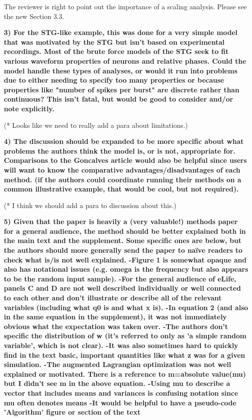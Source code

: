 \documentclass[11pt,a4paper]{article}
\begin{document}
The reviewer is right to point out the importance of a scaling analysis.  Please see the new Section 3.3. 

\textbf{3) For the STG-like example, this was done for a very simple model that was motivated by the STG but isn't based on experimental recordings. Most of the brute force models of the STG seek to fit various waveform properties of neurons and relative phases. Could the model handle these types of analyses, or would it run into problems due to either needing to specify too many properties or because properties like "number of spikes per burst" are discrete rather than continuous? This isn't fatal, but would be good to consider and/or note explicitly. }

(* Looks like we need to really add a para about limitations.)

\textbf{4) The discussion should be expanded to be more specific about what problems the authors think the model is, or is not, appropriate for. Comparisons to the Goncalves article would also be helpful since users will want to know the comparative advantages/disadvantages of each method. (if the authors could coordinate running their methods on a common illustrative example, that would be cool, but not required). }

(* I think we should add a para to discussion about this.)

\textbf{5) Given that the paper is heavily a (very valuable!) methods paper for a general audience, the method should be better explained both in the main text and the supplement. Some specific ones are below, but the authors should more generally send the paper to naïve readers to check what is/is not well explained. 
-Figure 1 is somewhat opaque and also has notational issues (e.g. omega is the frequency but also appears to be the random input sample). 
-For the general audience of eLife, panels C and D are not well described individually or well connected to each other and don't illustrate or describe all of the relevant variables (including what q0 is and what x is). 
-In equation 2 (and also in the same equation in the supplement), it was not immediately obvious what the expectation was taken over. 
-The authors don't specific the distribution of w (it's referred to only as 'a simple random variable', which is not clear). 
-It was also sometimes hard to quickly find in the text basic, important quantities like what z was for a given simulation. 
-The augmented Lagrangian optimization was not well explained or motivated. There is a reference to m=absolute value(mu) but I didn't see m in the above equation. 
-Using mu to describe a vector that includes means and variances is confusing notation since mu often denotes means 
-It would be helpful to have a pseudo-code 'Algorithm' figure or section of the text }
\end{document}
